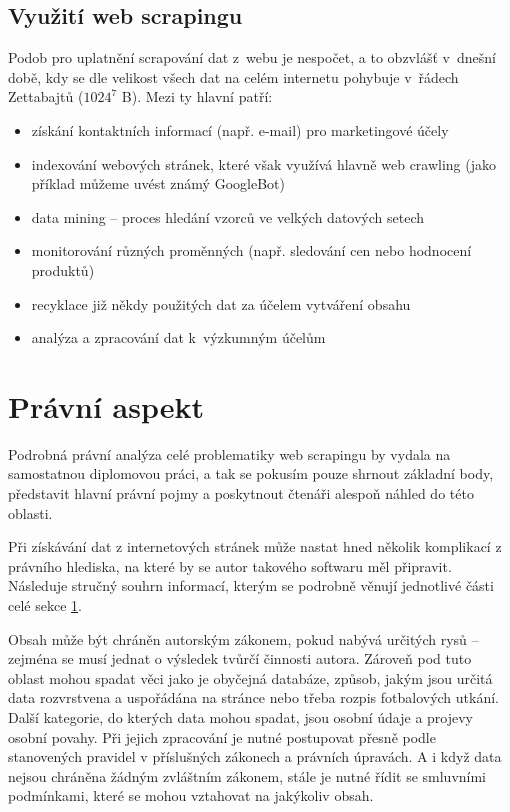 \documentclass[thesis=B,czech]{FITthesis}[2012/06/26]
\begin{document}
\subsection{Využití web scrapingu}
Podob pro uplatnění scrapování dat z~webu je nespočet, a to obzvlášť v~dnešní době, kdy se dle \cite{data_size} velikost všech dat na celém internetu pohybuje v~řádech Zettabajtů ($1024^{7}$ B). Mezi ty hlavní patří:
\begin{itemize}
	\item získání kontaktních informací (např. e-mail) pro marketingové účely
	\item indexování webových stránek, které však využívá hlavně web crawling (jako příklad můžeme uvést známý GoogleBot)
	\item data mining -- proces hledání vzorců ve velkých datových setech \cite{data_mining}
	\item monitorování různých proměnných (např. sledování cen nebo hodnocení produktů)
	\item recyklace již někdy použitých dat za účelem vytváření  obsahu
	\item analýza a zpracování dat k~výzkumným účelům
\end{itemize}


\section{Právní aspekt}
\label{sec:pravni_aspekt}
Podrobná právní analýza celé problematiky web scrapingu by vydala na samostatnou diplomovou práci, a tak se pokusím pouze shrnout základní body, představit hlavní právní pojmy a poskytnout čtenáři alespoň náhled do této oblasti. 

Při získávání dat z internetových stránek může nastat hned několik komplikací z právního hlediska, na které by se autor takového softwaru měl připravit. Následuje stručný souhrn informací, kterým se podrobně věnují jednotlivé části celé sekce \ref{sec:pravni_aspekt}.

Obsah může být chráněn autorským zákonem, pokud nabývá určitých rysů -- zejména se musí jednat o výsledek tvůrčí činnosti autora. Zároveň pod tuto oblast mohou spadat věci jako je obyčejná databáze, způsob, jakým jsou určitá data rozvrstvena a uspořádána na stránce nebo třeba rozpis fotbalových utkání. Další kategorie, do kterých data mohou spadat, jsou osobní údaje a projevy osobní povahy. Při jejich zpracování je nutné postupovat přesně podle stanovených pravidel v příslušných zákonech a právních úpravách. A i když data nejsou chráněna žádným zvláštním zákonem, stále je nutné řídit se smluvními podmínkami, které se mohou vztahovat na jakýkoliv obsah.
\end{document}
